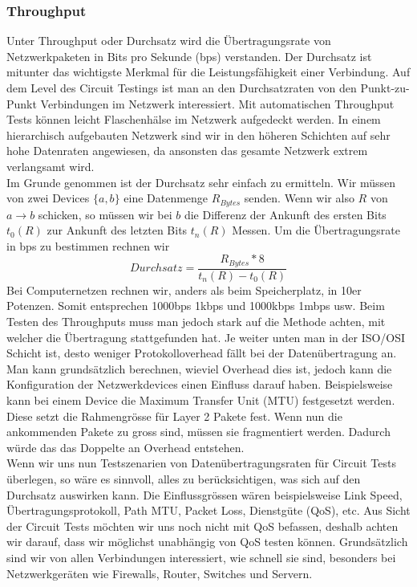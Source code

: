 \documentclass[a4,12pt]{scrartcl}
\begin{document}
\subsubsection{Throughput}
Unter Throughput oder Durchsatz wird die Übertragungsrate von Netzwerkpaketen in Bits pro Sekunde (bps) verstanden. Der Durchsatz ist mitunter das wichtigste Merkmal für die Leistungsfähigkeit einer Verbindung. Auf dem Level des Circuit Testings ist man an den Durchsatzraten von den Punkt-zu-Punkt Verbindungen im Netzwerk interessiert. Mit automatischen Throughput Tests können leicht Flaschenhälse im Netzwerk aufgedeckt werden. In einem hierarchisch aufgebauten Netzwerk sind wir in den höheren Schichten auf sehr hohe Datenraten angewiesen, da ansonsten das gesamte Netzwerk extrem verlangsamt wird.\\

\noindent Im Grunde genommen ist der Durchsatz sehr einfach zu ermitteln. Wir müssen von zwei Devices $\{a,b\}$ eine Datenmenge $R_{Bytes}$ senden. Wenn wir also $R$ von $a \rightarrow b$ schicken, so müssen wir bei $b$ die Differenz der Ankunft des ersten Bits $t_0(R)$ zur Ankunft des letzten Bits $t_n(R)$ Messen. Um die Übertragungsrate in bps zu bestimmen rechnen wir
\begin{equation}
Durchsatz = \frac{R_{Bytes} * 8}{t_n(R) - t_0(R)}  
\end{equation} 
Bei Computernetzen rechnen wir, anders als beim Speicherplatz, in 10er Potenzen. Somit entsprechen 1000bps 1kbps und 1000kbps 1mbps usw. Beim Testen des Throughputs muss man jedoch stark auf die Methode achten, mit welcher die Übertragung stattgefunden hat. Je weiter unten man in der ISO/OSI Schicht ist, desto weniger Protokolloverhead fällt bei der Datenübertragung an. Man kann grundsätzlich berechnen, wieviel Overhead dies ist, jedoch kann die Konfiguration der Netzwerkdevices einen Einfluss darauf haben. Beispielsweise kann bei einem Device die Maximum Transfer Unit (MTU) festgesetzt werden. Diese setzt die Rahmengrösse für Layer 2 Pakete fest. Wenn nun die ankommenden Pakete zu gross sind, müssen sie fragmentiert werden. Dadurch würde das das Doppelte an Overhead entstehen.\\

\noindent Wenn wir uns nun Testszenarien von Datenübertragungsraten für Circuit Tests überlegen, so wäre es sinnvoll, alles zu berücksichtigen, was sich auf den Durchsatz auswirken kann. Die Einflussgrössen wären beispielsweise Link Speed, Übertragungsprotokoll, Path MTU, Packet Loss, Dienstgüte (QoS), etc. Aus Sicht der Circuit Tests möchten wir uns noch nicht mit QoS befassen, deshalb achten wir darauf, dass wir möglichst unabhängig von QoS testen können. Grundsätzlich sind wir von allen Verbindungen interessiert, wie schnell sie sind, besonders bei Netzwerkgeräten wie Firewalls, Router, Switches und Servern.\\
\end{document}
